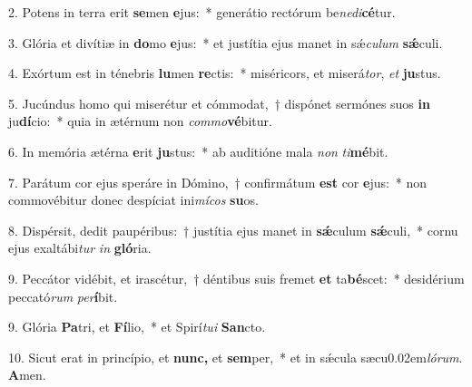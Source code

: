\item 2. Potens in terra erit \textbf{se}men \textbf{e}jus:~* generátio rectórum be\textit{nedi}\textbf{cé}tur.
\item 3. Glória et divítiæ in \textbf{do}mo \textbf{e}jus:~* et justítia ejus manet in sǽ\textit{culum} \textbf{sǽ}culi.
\item 4. Exórtum est in ténebris \textbf{lu}men \textbf{re}ctis:~* miséricors, et miserá\textit{tor}, \textit{et} \textbf{ju}stus.
\item 5. Jucúndus homo qui miserétur et cómmodat,~† dispónet sermónes suos \textbf{in} ju\textbf{dí}cio:~* quia in ætérnum non \textit{commo}\textbf{vé}bitur.
\item 6. In memória ætérna \textbf{e}rit \textbf{ju}stus:~* ab auditióne mala \textit{non} \textit{ti}\textbf{mé}bit.
\item 7. Parátum cor ejus speráre in Dómino,~† confirmátum \textbf{est} cor \textbf{e}jus:~* non commovébitur donec despíciat ini\textit{mícos} \textbf{su}os.
\item 8. Dispérsit, dedit paupéribus:~† justítia ejus manet in \textbf{sǽ}culum \textbf{sǽ}culi,~* cornu ejus exaltábi\textit{tur} \textit{in} \textbf{gló}ria.
\item 9. Peccátor vidébit, et irascétur,~† déntibus suis fremet \textbf{et} ta\textbf{bé}scet:~* desidérium peccató\textit{rum} \textit{per}\textbf{í}bit.
\item 9. Glória \textbf{Pa}tri, et \textbf{Fí}lio,~* et Spirí\hspace{0.03em}\textit{tui} \textbf{San}cto.
\item 10. Sicut erat in princípio, et \textbf{nunc,} et \textbf{sem}per,~* et in sǽcula sæcu\kern0.02em\textit{lórum}. \textbf{A}men.
